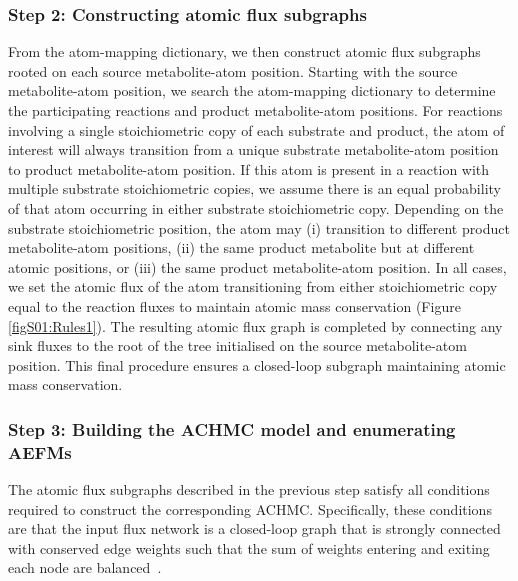 \documentclass[12pt]{article}
\begin{document}
\subsubsection*{Step 2: Constructing atomic flux subgraphs}




From the atom-mapping dictionary, we then construct atomic flux subgraphs
rooted on each source metabolite-atom position. Starting with the source
metabolite-atom position, we search the atom-mapping dictionary to
determine the participating reactions and product metabolite-atom
positions. For reactions involving a single stoichiometric copy of each
substrate and product, the atom of interest will always transition from
a unique substrate metabolite-atom position to product metabolite-atom
position. If this atom is present in a reaction with multiple substrate
stoichiometric copies, we assume there is an equal probability of that
atom occurring in either substrate stoichiometric copy. Depending on the
substrate stoichiometric position, the atom may (i) transition to
different product metabolite-atom positions, (ii) the same product
metabolite but at different atomic positions, or (iii) the same product
metabolite-atom position. In all cases, we set the atomic flux of the atom
transitioning from either stoichiometric copy equal to the reaction fluxes
to maintain atomic mass conservation (Figure {\ref{figS01:Rules1}}). The
resulting atomic flux graph is completed by connecting any sink fluxes to
the root of the tree initialised on the source metabolite-atom position.
This final procedure ensures a closed-loop subgraph maintaining atomic
mass conservation.


\subsubsection*{Step 3: Building the ACHMC model and enumerating AEFMs}

The atomic flux subgraphs described in the previous step satisfy all
conditions required to construct the corresponding ACHMC. Specifically,
these conditions are that the input flux network is a closed-loop graph
that is strongly connected with conserved edge weights such that the sum
of weights entering and exiting each node are
balanced~\citep{ChitpinJustinG2023AMct}.
\end{document}
